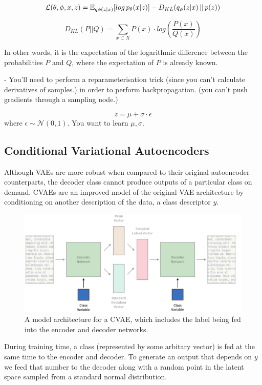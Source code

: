 \documentclass[12pt,twoside]{report}
\begin{document}
  $$\mathcal{L}(\theta, \phi, x, z) = \mathbb{E}_{q \phi (z|x)}[log \thinspace p_{\theta}(x|z)] - D_{KL}(q_{\phi}(z|x)\thinspace||\thinspace p(z)) $$

$$
D_{KL}(P ||Q) = \sum_{x \subset X} P(x) \cdot log (\frac{P(x)}{Q(x)})
$$

In other words, it is the expectation of the logarithmic difference between the probabilities $P$ and $Q$, where the expectation of $P$ is already known.

- You'll need to perform a reparameterisation trick (since you can't calculate derivatives of samples.) in order to perform backpropagation. (you can't push gradients through a sampling node.)
  
$$z = \mu + \sigma \cdot \epsilon $$ where $\epsilon \sim \mathcal{N}(0,1)$. You want to learn $\mu, \sigma$.

\subsection{Conditional Variational Autoencoders}

Although VAEs are more robust when compared to their original autoencoder counterparts, the decoder class cannot produce outputs of a particular class on demand. CVAEs are an improved model of the original VAE architecture by conditioning on another description of the data, a class descriptor $y$. 

\begin{figure}[!ht]
      
	\centering
	\includegraphics[width=150mm]{diagrams/conditional_variational_autoencoders.pdf}
	\caption{A model architecture for a CVAE, which includes the label being fed into the encoder and decoder networks. \label{cvae_diagram}}
  \end{figure}

During training time, a class (represented by some arbitary vector) is fed at the same time to the encoder and decoder. To generate an output that depends on $y$ we feed that number to the decoder along with a random point in the latent space sampled from a standard normal distribution.
\end{document}
